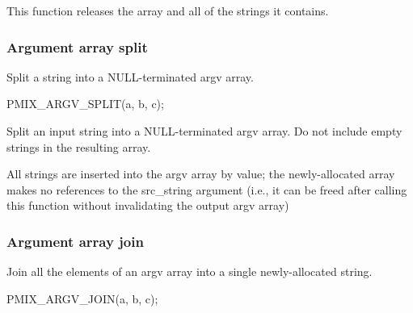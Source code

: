 \descr

This function releases the array and all of the strings it contains.

\subsubsection{Argument array split}

\summary

Split a string into a NULL-terminated argv array.

\cspecificstart
\begin{codepar}
PMIX_ARGV_SPLIT(a, b, c);
\end{codepar}
\cspecificend

\begin{arglist}
\end{arglist}

\descr

Split an input string into a NULL-terminated argv array. Do not include empty strings in the resulting array.

\adviceuserstart
All strings are inserted into the argv array by value; the newly-allocated array makes no references to the src_string argument (i.e., it can be freed after calling this function without invalidating the output argv array)
\adviceuserend

\subsubsection{Argument array join}

\summary

Join all the elements of an argv array into a single newly-allocated string.

\cspecificstart
\begin{codepar}
PMIX_ARGV_JOIN(a, b, c);
\end{codepar}
\cspecificend

\begin{arglist}
\end{arglist}

\descr


